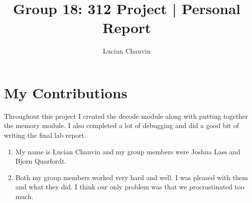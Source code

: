 \documentclass{article}
\title{Group 18: 312 Project | Personal Report}
\author{Lucian Chauvin}
\begin{document}
\maketitle
    \vspace{-2cm}
\section{My Contributions}
Throughout this project I created the decode module along with putting together the memory module. I also completed a lot of debugging and did a good bit of writing the final lab report.
\begin{enumerate}
    \item My name is Lucian Chauvin and my group members were Joshua Lass and Bjorn Quarfordt.
    \item Both my group members worked very hard and well. I was pleased with them and what they did. I think our only problem was that we procrastinated too much.
\end{enumerate}
\end{document}
